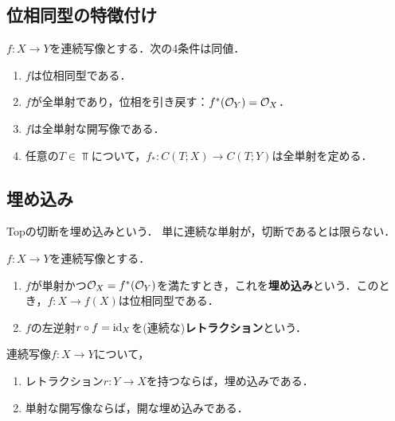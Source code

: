 \documentclass[uplatex,dvipdfmx]{jsreport}
\begin{document}
\subsection{位相同型の特徴付け}

\begin{proposition}
    $f:X\to Y$を連続写像とする．次の4条件は同値．
    \begin{enumerate}
        \item $f$は位相同型である．
        \item $f$が全単射であり，位相を引き戻す：$f^*(\mathcal{O}_Y)=\mathcal{O}_X$．
        \item $f$は全単射な開写像である．
        \item 任意の$T\in\Top$について，$f_*:C(T;X)\to C(T;Y)$は全単射を定める．
    \end{enumerate}
\end{proposition}

\subsection{埋め込み}

\begin{tcolorbox}[colframe=ForestGreen, colback=ForestGreen!10!white,breakable,colbacktitle=ForestGreen!40!white,coltitle=black,fonttitle=\bfseries\sffamily,
title=]
    Topの切断を埋め込みという．
    単に連続な単射が，切断であるとは限らない．
\end{tcolorbox}

\begin{definition}
    $f:X\to Y$を連続写像とする．
    \begin{enumerate}
        \item $f$が単射かつ$\mathcal{O}_X=f^*(\mathcal{O}_Y)$を満たすとき，これを\textbf{埋め込み}という．このとき，$f:X\to f(X)$は位相同型である．
        \item $f$の左逆射$r\circ f=\mathrm{id}_X$を(連続な)\textbf{レトラクション}という．
    \end{enumerate}
\end{definition}

\begin{proposition}[埋め込みであることの十分条件]
    連続写像$f:X\to Y$について，
    \begin{enumerate}
        \item レトラクション$r:Y\to X$を持つならば，埋め込みである．
        \item 単射な開写像ならば，開な埋め込みである．
    \end{enumerate}
\end{proposition}
\end{document}
